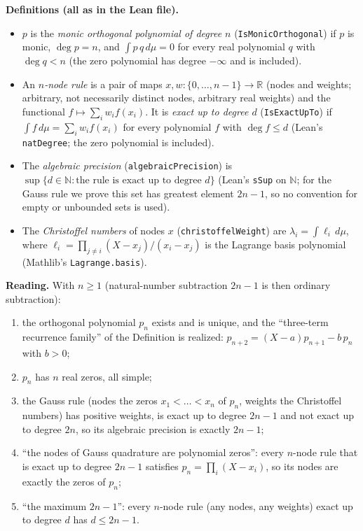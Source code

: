 \documentclass[11pt]{article}
\theoremstyle{definition}
\newcommand{\R}{\mathbb{R}}
\begin{document}
\textbf{Definitions (all as in the Lean file).}
\begin{itemize}
\item $p$ is the \emph{monic orthogonal polynomial of degree $n$} (\texttt{IsMonicOrthogonal}) if
  $p$ is monic, $\deg p=n$, and $\int p\,q\,d\mu=0$ for every real polynomial $q$ with
  $\deg q<n$ (the zero polynomial has degree $-\infty$ and is included).
\item An \emph{$n$-node rule} is a pair of maps $x,w:\{0,\dots,n-1\}\to\R$ (nodes and weights;
  arbitrary, not necessarily distinct nodes, arbitrary real weights) and the functional
  $f\mapsto\sum_i w_i f(x_i)$. It is \emph{exact up to degree $d$} (\texttt{IsExactUpTo}) if
  $\int f\,d\mu=\sum_i w_i f(x_i)$ for every polynomial $f$ with $\deg f\le d$ (Lean's
  \texttt{natDegree}; the zero polynomial is included).
\item The \emph{algebraic precision} (\texttt{algebraicPrecision}) is
  $\sup\{d\in\mathbb{N} : \text{the rule is exact up to degree } d\}$ (Lean's \texttt{sSup} on
  $\mathbb{N}$; for the Gauss rule we prove this set has greatest element $2n-1$, so no
  convention for empty or unbounded sets is used).
\item The \emph{Christoffel numbers} of nodes $x$ (\texttt{christoffelWeight}) are
  $\lambda_i=\int \ell_i\,d\mu$, where $\ell_i=\prod_{j\neq i}(X-x_j)/(x_i-x_j)$ is the Lagrange
  basis polynomial (Mathlib's \texttt{Lagrange.basis}).
\end{itemize}

\textbf{Reading.} With $n\ge 1$ (natural-number subtraction $2n-1$ is then ordinary subtraction):
\begin{enumerate}
\item the orthogonal polynomial $p_n$ exists and is unique, and the ``three-term recurrence family''
  of the Definition is realized: $p_{n+2}=(X-a)p_{n+1}-b\,p_n$ with $b>0$;
\item $p_n$ has $n$ real zeros, all simple;
\item the Gauss rule (nodes the zeros $x_1<\dots<x_n$ of $p_n$, weights the Christoffel numbers)
  has positive weights, is exact up to degree $2n-1$ and not exact up to degree $2n$, so its
  algebraic precision is exactly $2n-1$;
\item ``the nodes of Gauss quadrature are polynomial zeros'': every $n$-node rule that is exact up
  to degree $2n-1$ satisfies $p_n=\prod_i (X-x_i)$, so its nodes are exactly the zeros of $p_n$;
\item ``the maximum $2n-1$'': every $n$-node rule (any nodes, any weights) exact up to degree $d$
  has $d\le 2n-1$.
\end{enumerate}
\end{document}
